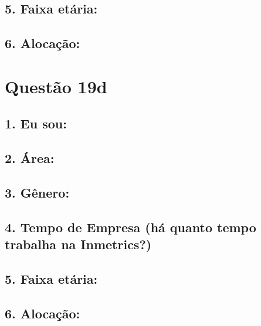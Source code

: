 \documentclass[]{book}
\begin{document}
\hypertarget{faixa-etaria-47}{%
\subsection{5. Faixa etária:}\label{faixa-etaria-47}}

\hypertarget{alocacao-47}{%
\subsection{6. Alocação:}\label{alocacao-47}}

\hypertarget{questao-19d}{%
\section{Questão 19d}\label{questao-19d}}

\hypertarget{eu-sou-48}{%
\subsection{1. Eu sou:}\label{eu-sou-48}}

\hypertarget{area-48}{%
\subsection{2. Área:}\label{area-48}}

\hypertarget{genero-48}{%
\subsection{3. Gênero:}\label{genero-48}}

\hypertarget{tempo-de-empresa-ha-quanto-tempo-trabalha-na-inmetrics-48}{%
\subsection{4. Tempo de Empresa (há quanto tempo trabalha na Inmetrics?)}\label{tempo-de-empresa-ha-quanto-tempo-trabalha-na-inmetrics-48}}

\hypertarget{faixa-etaria-48}{%
\subsection{5. Faixa etária:}\label{faixa-etaria-48}}

\hypertarget{alocacao-48}{%
\subsection{6. Alocação:}\label{alocacao-48}}
\end{document}
